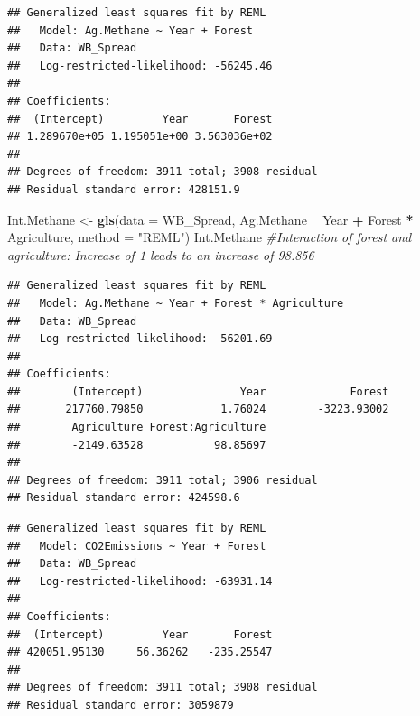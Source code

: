 \documentclass[12pt,]{article}
\newenvironment{Shaded}{\begin{snugshade}}{\end{snugshade}}
\newcommand{\KeywordTok}[1]{\textcolor[rgb]{0.13,0.29,0.53}{\textbf{#1}}}
\newcommand{\DataTypeTok}[1]{\textcolor[rgb]{0.13,0.29,0.53}{#1}}
\newcommand{\StringTok}[1]{\textcolor[rgb]{0.31,0.60,0.02}{#1}}
\newcommand{\CommentTok}[1]{\textcolor[rgb]{0.56,0.35,0.01}{\textit{#1}}}
\newcommand{\OperatorTok}[1]{\textcolor[rgb]{0.81,0.36,0.00}{\textbf{#1}}}
\newcommand{\NormalTok}[1]{#1}
\begin{document}
\begin{verbatim}
## Generalized least squares fit by REML
##   Model: Ag.Methane ~ Year + Forest 
##   Data: WB_Spread 
##   Log-restricted-likelihood: -56245.46
## 
## Coefficients:
##  (Intercept)         Year       Forest 
## 1.289670e+05 1.195051e+00 3.563036e+02 
## 
## Degrees of freedom: 3911 total; 3908 residual
## Residual standard error: 428151.9
\end{verbatim}

\begin{Shaded}
\begin{Highlighting}[]
\NormalTok{Int.Methane <-}\StringTok{  }\KeywordTok{gls}\NormalTok{(}\DataTypeTok{data =}\NormalTok{ WB_Spread,}
\NormalTok{                    Ag.Methane }\OperatorTok{~}\StringTok{ }\NormalTok{Year }\OperatorTok{+}\StringTok{ }\NormalTok{Forest }\OperatorTok{*}\StringTok{ }\NormalTok{Agriculture,}
                    \DataTypeTok{method =} \StringTok{"REML"}\NormalTok{)}
\NormalTok{Int.Methane }\CommentTok{#Interaction of forest and agriculture: Increase of 1 leads to an increase of 98.856}
\end{Highlighting}
\end{Shaded}

\begin{verbatim}
## Generalized least squares fit by REML
##   Model: Ag.Methane ~ Year + Forest * Agriculture 
##   Data: WB_Spread 
##   Log-restricted-likelihood: -56201.69
## 
## Coefficients:
##        (Intercept)               Year             Forest 
##       217760.79850            1.76024        -3223.93002 
##        Agriculture Forest:Agriculture 
##        -2149.63528           98.85697 
## 
## Degrees of freedom: 3911 total; 3906 residual
## Residual standard error: 424598.6
\end{verbatim}

\begin{Shaded}
\end{Shaded}

\begin{verbatim}
## Generalized least squares fit by REML
##   Model: CO2Emissions ~ Year + Forest 
##   Data: WB_Spread 
##   Log-restricted-likelihood: -63931.14
## 
## Coefficients:
##  (Intercept)         Year       Forest 
## 420051.95130     56.36262   -235.25547 
## 
## Degrees of freedom: 3911 total; 3908 residual
## Residual standard error: 3059879
\end{verbatim}
\end{document}
